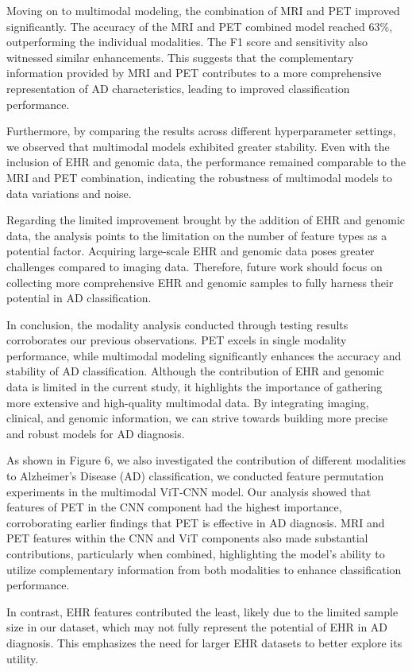 Moving on to multimodal modeling, the combination of MRI and PET improved significantly. The accuracy of the MRI and PET combined model reached 63\%, outperforming the individual modalities. The F1 score and sensitivity also witnessed similar enhancements. This suggests that the complementary information provided by MRI and PET contributes to a more comprehensive representation of AD characteristics, leading to improved classification performance. 

Furthermore, by comparing the results across different hyperparameter settings, we observed that multimodal models exhibited greater stability. Even with the inclusion of EHR and genomic data, the performance remained comparable to the MRI and PET combination, indicating the robustness of multimodal models to data variations and noise. 

Regarding the limited improvement brought by the addition of EHR and genomic data, the analysis points to the limitation on the number of feature types  as a potential factor. Acquiring large-scale EHR and genomic data poses greater challenges compared to imaging data. Therefore, future work should focus on collecting more comprehensive EHR and genomic samples to fully harness their potential in AD classification. 

In conclusion, the modality analysis conducted through testing results corroborates our previous observations. PET excels in single modality performance, while multimodal modeling significantly enhances the accuracy and stability of AD classification. Although the contribution of EHR and genomic data is limited in the current study, it highlights the importance of gathering more extensive and high-quality multimodal data. By integrating imaging, clinical, and genomic information, we can strive towards building more precise and robust models for AD diagnosis. 

As shown in Figure 6, we also investigated the contribution of different modalities to Alzheimer's Disease (AD) classification, we conducted feature permutation experiments in the multimodal ViT-CNN model. Our analysis showed that features of PET in the CNN component had the highest importance, corroborating earlier findings that PET is effective in AD diagnosis. MRI and PET features within the CNN and ViT components also made substantial contributions, particularly when combined, highlighting the model's ability to utilize complementary information from both modalities to enhance classification performance. 

In contrast, EHR features contributed the least, likely due to the limited sample size in our dataset, which may not fully represent the potential of EHR in AD diagnosis. This emphasizes the need for larger EHR datasets to better explore its utility. 

